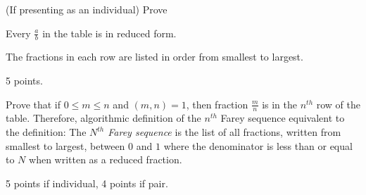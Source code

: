 \documentclass[letterpaper, 11 pt]{ximera}
\begin{document}
\begin{exploration}
\begin{problem}(If presenting as an individual)
  Prove \begin{corollary}
 Every $\frac{a}{b}$ in the table is in reduced form.
\end{corollary}

\begin{corollary}
 The fractions in each row are listed in order from smallest to largest.
\end{corollary}

\begin{rubric}
 5 points.
\end{rubric}
\end{problem}



\begin{problem}
	Prove that if $0\leq m \leq n$ and $(m,n)=1$, then fraction $\frac{m}{n}$ is in the $n^{th}$ row of the table. Therefore, algorithmic definition of the $n^{th}$ Farey sequence equivalent to the definition: The \emph{$N^{th}$ Farey sequence} is the list of all fractions, written from smallest to largest, between $0$ and $1$ where the denominator is less than or equal to $N$ when written as a reduced fraction.
	
\begin{rubric}
 5 points if individual, 4 points if pair.
\end{rubric}
\end{problem}
\end{exploration}
\end{document}
